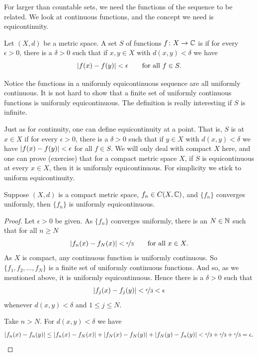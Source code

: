 For larger than countable sets,
we need the functions of the sequence to be related.  We look at
continuous functions, and the concept we need is equicontinuity.

\begin{defn}
Let $(X,d)$ be a metric space.
A set $S$ of functions
$f \colon X \to {\mathbb{C}}$ is 
\emph{}
if for every $\epsilon > 0$, there is a $\delta > 0$
such that if $x,y \in X$ with $d(x,y) < \delta$ we have
\begin{equation*}
\lvert {f(x)-f(y)} \rvert < \epsilon \qquad \text{for all } f \in S .
\end{equation*}
\end{defn}

Notice the functions in a uniformly equicontinuous sequence are
all uniformly continuous.  It is 
not hard to show that a finite set of uniformly continuous functions
is uniformly equicontinuous.  The definition is really interesting
if $S$ is infinite.

Just as for continuity, one can define equicontinuity at a point.
That is, $S$ is \emph{} at $x \in X$
if for every $\epsilon > 0$, there is a $\delta > 0$
such that if $y \in X$ with $d(x,y) < \delta$ we have
$\lvert {f(x)-f(y)} \rvert < \epsilon$ for all $f \in S$.
We will only deal with compact $X$ here, and
one can prove (exercise) that for a compact metric space $X$,
if $S$ is equicontinuous at every $x \in X$,
then it is uniformly equicontinuous.  For simplicity
we stick to uniform equicontinuity.

\begin{prop}
Suppose $(X,d)$ is a compact metric space,
$f_n \in C(X,{\mathbb{C}})$, and $\{ f_n \}$
converges uniformly, then $\{ f_n \}$ is uniformly equicontinuous.
\end{prop}

\begin{proof}
Let $\epsilon > 0$ be given.
As $\{ f_n \}$ converges uniformly, there is an $N \in {\mathbb{N}}$ such that for
all $n \geq N$
\begin{equation*}
\lvert {f_n(x)-f_N(x)} \rvert < \nicefrac{\epsilon}{3} \qquad \text{for all } x \in X.
\end{equation*}
As $X$ is compact, any continuous function is uniformly continuous.
So $\{ f_1,f_2,\ldots,f_N \}$ is a finite set of uniformly continuous
functions.  And so, as we mentioned above, it is uniformly equicontinuous.
Hence there is a $\delta > 0$ such that
\begin{equation*}
\lvert {f_j(x)-f_j(y)} \rvert < \nicefrac{\epsilon}{3} < \epsilon
\end{equation*}
whenever $d(x,y) < \delta$ and $1 \leq j \leq N$.

Take $n > N$.  For $d(x,y) < \delta$ we have
\begin{equation*}
\lvert {f_n(x)-f_n(y)} \rvert
\leq
\lvert {f_n(x)-f_N(x)} \rvert
+
\lvert {f_N(x)-f_N(y)} \rvert
+
\lvert {f_N(y)-f_n(y)} \rvert
<
\nicefrac{\epsilon}{3}
+
\nicefrac{\epsilon}{3}
+
\nicefrac{\epsilon}{3}
=\epsilon . \qedhere
\end{equation*}
\end{proof}

